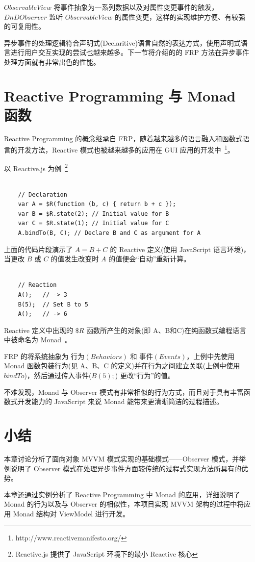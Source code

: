 $ObservableView$ 将事件抽象为一系列数据以及对属性变更事件的触发，$DnDObserver$ 监听 $ObservableView$ 的属性变更，这样的实现维护方便、有较强的可复用性。

异步事件的处理逻辑符合声明式(Declaritive)语言自然的表达方式，使用声明式语言进行用户交互实现的尝试也越来越多。下一节将介绍的的 FRP 方法在异步事件处理方面就有非常出色的性能。

\section{Reactive Programming 与 Monad 函数}

Reactive Programming 的概念继承自 FRP，随着越来越多的语言融入和函数式语言的开发方法，Reactive 模式也被越来越多的应用在 GUI 应用的开发中~\footnote{http://www.reactivemanifesto.org/}。

以 Reactive.js 为例~\footnote{Reactive.js 提供了 JavaScript 环境下的最小 Reactive 核心}

\begin{verbatim}

    // Declaration
    var A = $R(function (b, c) { return b + c });
    var B = $R.state(2); // Initial value for B
    var C = $R.state(1); // Initial value for C
    A.bindTo(B, C); // Declare B and C as argument for A

\end{verbatim}

上面的代码片段演示了 $A = B + C$ 的 Reactive 定义(使用 JavaScript 语言环境)，当更改 $B$ 或 $C$ 的值发生改变时 $A$ 的值便会“自动”重新计算。

\begin{verbatim}

    // Reaction
    A();   // -> 3
    B(5);  // Set B to 5
    A();   // -> 6

\end{verbatim}

Reactive 定义中出现的 $\$R$ 函数所产生的对象(即 A、B和C)在纯函数式编程语言中被命名为 Monad~\cite{raey}。

FRP 的将系统抽象为 $行为(Behaviors)$ 和 $事件(Events)$，上例中先使用 Monad 函数包装行为(见 A、B、C 的定义)并在行为之间建立关联(上例中使用 $bindTo$)，然后通过传入事件($B(5);$) 更改“行为”的值。

不难发现，Monad 与 Observer 模式有非常相似的行为方式，而且对于具有丰富函数式开发能力的 JavaScript 来说 Monad 能带来更清晰简洁的过程描述。

\section{小结}

本章讨论分析了面向对象 MVVM 模式实现的基础模式——Observer 模式，并举例说明了 Observer 模式在处理异步事件方面较传统的过程式实现方法所具有的优势。

本章还通过实例分析了 Reactive Programming 中 Monad 的应用，详细说明了 Monad 的行为以及与 Observer 的相似性，本项目实现 MVVM 架构的过程中将应用 Monad 结构对 ViewModel 进行开发。


